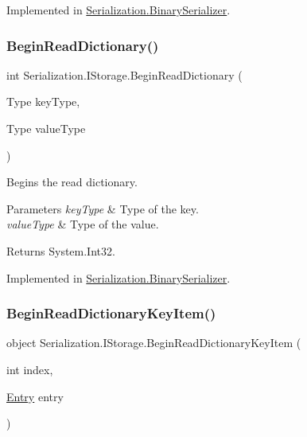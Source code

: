 Implemented in \hyperlink{class_serialization_1_1_binary_serializer_a6b09a7f66a88dc5488ed1fc5996f5452}{Serialization.\+Binary\+Serializer}.

\mbox{\label{interface_serialization_1_1_i_storage_a57c3bee701eba61b73c8ea69f29d3ca3}} 
\subsubsection{\texorpdfstring{Begin\+Read\+Dictionary()}{BeginReadDictionary()}}
{\footnotesize\ttfamily int Serialization.\+I\+Storage.\+Begin\+Read\+Dictionary (\begin{DoxyParamCaption}\item[{Type}]{key\+Type,  }\item[{Type}]{value\+Type }\end{DoxyParamCaption})}



Begins the read dictionary. 


\begin{DoxyParams}{Parameters}
{\em key\+Type} & Type of the key.\\
\hline
{\em value\+Type} & Type of the value.\\
\hline
\end{DoxyParams}
\begin{DoxyReturn}{Returns}
System.\+Int32.
\end{DoxyReturn}


Implemented in \hyperlink{class_serialization_1_1_binary_serializer_adbc9aab40ec3aa70f3cd72ddbd6bbcba}{Serialization.\+Binary\+Serializer}.

\mbox{\label{interface_serialization_1_1_i_storage_a3739c13259528b0042e3e150357638a2}} 
\subsubsection{\texorpdfstring{Begin\+Read\+Dictionary\+Key\+Item()}{BeginReadDictionaryKeyItem()}}
{\footnotesize\ttfamily object Serialization.\+I\+Storage.\+Begin\+Read\+Dictionary\+Key\+Item (\begin{DoxyParamCaption}\item[{int}]{index,  }\item[{\hyperlink{class_serialization_1_1_entry}{Entry}}]{entry }\end{DoxyParamCaption})}



